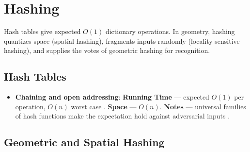 \section{Hashing}
\label{sec:app_alg_hashing}

Hash tables give expected $O(1)$ dictionary operations. In geometry,
hashing quantizes space (spatial hashing), fragments inputs randomly
(locality-sensitive hashing), and supplies the votes of geometric hashing
for recognition.

\subsection{Hash Tables}
\label{sec:appalgs_hash_tables}

\begin{itemize}
  \item \textbf{Chaining and open addressing}:
    \textbf{Running Time} --- expected $O(1)$ per operation, $O(n)$ worst
    case \cite{cormen2009}. \textbf{Space} --- $O(n)$. \textbf{Notes} ---
    universal families of hash functions make the expectation hold against
    adversarial inputs \cite{cormen2009}.
\end{itemize}

\subsection{Geometric and Spatial Hashing}
\label{sec:appalgs_hash_geometric}

